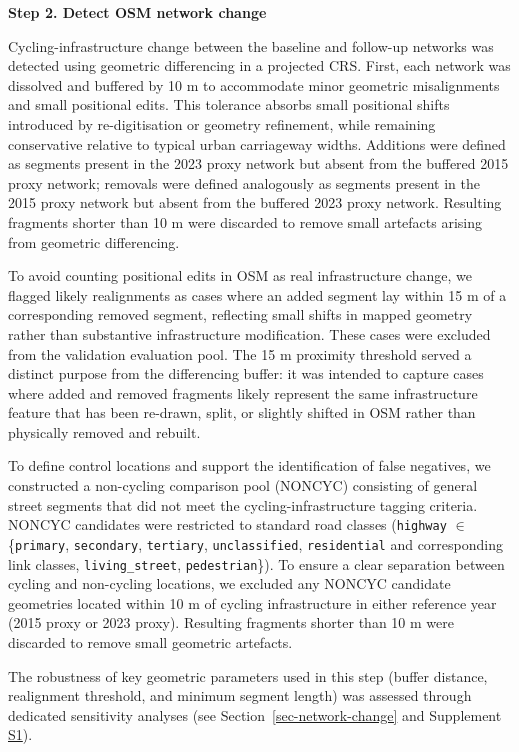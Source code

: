 \documentclass[
]{article}
\begin{document}
\textbf{Step 2. Detect OSM network change}

Cycling-infrastructure change between the baseline and follow-up
networks was detected using geometric differencing in a projected CRS.
First, each network was dissolved and buffered by 10 m to accommodate
minor geometric misalignments and small positional edits. This tolerance
absorbs small positional shifts introduced by re-digitisation or
geometry refinement, while remaining conservative relative to typical
urban carriageway widths. Additions were defined as segments present in
the 2023 proxy network but absent from the buffered 2015 proxy network;
removals were defined analogously as segments present in the 2015 proxy
network but absent from the buffered 2023 proxy network. Resulting
fragments shorter than 10 m were discarded to remove small artefacts
arising from geometric differencing.

To avoid counting positional edits in OSM as real infrastructure change,
we flagged likely realignments as cases where an added segment lay
within 15 m of a corresponding removed segment, reflecting small shifts
in mapped geometry rather than substantive infrastructure modification.
These cases were excluded from the validation evaluation pool. The 15 m
proximity threshold served a distinct purpose from the differencing
buffer: it was intended to capture cases where added and removed
fragments likely represent the same infrastructure feature that has been
re-drawn, split, or slightly shifted in OSM rather than physically
removed and rebuilt.

To define control locations and support the identification of false
negatives, we constructed a non-cycling comparison pool (NONCYC)
consisting of general street segments that did not meet the
cycling-infrastructure tagging criteria. NONCYC candidates were
restricted to standard road classes (\texttt{highway} \(\in\)
\{\texttt{primary}, \texttt{secondary}, \texttt{tertiary},
\texttt{unclassified}, \texttt{residential} and corresponding link
classes, \texttt{living\_street}, \texttt{pedestrian}\}). To ensure a
clear separation between cycling and non-cycling locations, we excluded
any NONCYC candidate geometries located within 10 m of cycling
infrastructure in either reference year (2015 proxy or 2023 proxy).
Resulting fragments shorter than 10 m were discarded to remove small
geometric artefacts.

\color{black}The robustness of key geometric parameters used in this
step (buffer distance, realignment threshold, and minimum segment
length) was assessed through dedicated sensitivity analyses (see
Section~\ref{sec-network-change} and Supplement
\hyperref[s1-sensitivity]{S1}).\color{black}
\end{document}
